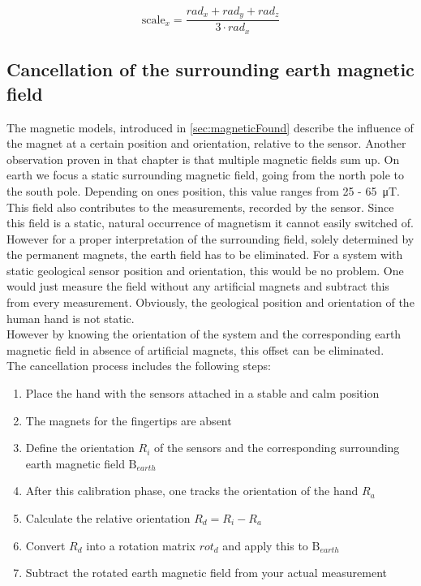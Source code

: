 \begin{equation} \label{eq:scaleX}
\mathrm{scale}_{x} = \frac{rad_{x}+rad_{y}+rad_{z}}{3 \cdot rad_{x}}
\end{equation}


\subsection{Cancellation of the surrounding earth magnetic field}

The magnetic models, introduced in \ref{sec:magneticFound} describe the influence of the magnet at a certain position and orientation, relative to the sensor. Another observation proven in that chapter is that multiple magnetic fields sum up. On earth we focus a static surrounding magnetic field, going from the north pole to the south pole. Depending on ones position, this value ranges from 25 - \SI{65}{\micro \tesla}. This field also contributes to the measurements, recorded by the sensor. Since this field is a static, natural occurrence of magnetism it cannot easily switched of. However for a proper interpretation of the surrounding field, solely determined by the permanent magnets, the earth field has to be eliminated. For a system with static geological sensor position and orientation, this would be no problem. One would just measure the field without any artificial magnets and subtract this from every measurement. Obviously, the geological position and orientation of the human hand is not static.\\
However by knowing the orientation of the system and the corresponding earth magnetic field in absence of artificial magnets, this offset can be eliminated.\\
The cancellation process includes the following steps:\\
\begin{enumerate}
\item Place the hand with the sensors attached in a stable and calm position
\item The magnets for the fingertips are absent
\item Define the orientation $ R_{i} $ of the sensors and the corresponding surrounding earth magnetic field $ \mathrm{B}_{earth} $
\item After this calibration phase, one tracks the orientation of the hand $ R_{a} $
\item Calculate the relative orientation $ R_{d} = R_{i} - R_{a} $
\item Convert $ R_{d} $ into a rotation matrix $ rot_{d} $ and apply this to $ \mathrm{B}_{earth} $
\item Subtract the rotated earth magnetic field from your actual measurement
\end{enumerate}
